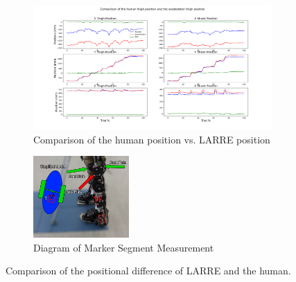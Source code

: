 \begin{figure}[h!]

    \begin{subfigure}{\textwidth}
        \centering
        \captionsetup{justification=centering}
        \centerline{
        \includegraphics[width=\textwidth, frame]{images/mech_design/position_comparison.png}}
        \caption[Comparison of Difference of Human and LARRE Position]{Comparison of the human position vs. LARRE position}
        \label{fig:positioncomparison}
    \end{subfigure}
        \begin{subfigure}{\textwidth}
        \centering
        \captionsetup{justification=centering}
        \centerline{
        \includegraphics[width=0.4\textwidth, frame]{images/mech_design/side_marker_positioning.png}}
        \caption[Diagram of Marker Segment Measurement]{Diagram of Marker Segment Measurement}
        \label{fig:markerpositiondiagram}
    \end{subfigure}
    \caption[Comparison of LARRE and human positions]{Comparison of the positional difference of LARRE and the human.}
    \label{fig:exohumanmarkercompare}
\end{figure}




